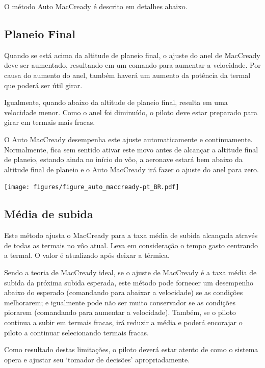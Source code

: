 O método Auto MacCready é descrito em detalhes abaixo.  

\subsection*{Planeio Final}

Quando se está acima da altitude de planeio final, o ajuste do anel de MacCready deve ser aumentado, resultando em um comando para aumentar a velocidade.  Por causa do aumento do anel, também haverá um aumento da potência da termal que poderá ser útil girar.

Igualmente, quando abaixo da altitude de planeio final, resulta em uma velocidade menor.  Como o anel foi diminuído, o piloto deve estar preparado para girar em termais mais fracas.

O Auto MacCready desempenha este ajuste automaticamente e continuamente.  Normalmente, fica sem sentido ativar este movo antes de alcançar a altitude final de planeio, estando ainda no início do vôo, a aeronave estará bem abaixo da altitude final de planeio e o Auto MacCready irá fazer o ajuste do anel para zero.  


\begin{maxipage}
\begin{center}
\texttt{[image: figures/figure\_auto\_maccready-pt\_BR.pdf]}
\end{center}
\end{maxipage}


\subsection*{Média de subida}

Este método ajusta o MacCready para a taxa média de subida alcançada através de todas as termais no vôo atual.  Leva em consideração o tempo gasto centrando a termal.  O valor é atualizado após deixar a térmica.

Sendo a teoria de MacCready ideal, se o ajuste de MacCready é a taxa média de subida da próxima subida esperada, este método pode fornecer um desempenho abaixo do esperado (comandando para abaixar a velocidade) se as condições melhorarem; e igualmente pode não ser muito conservador se as condições piorarem (comandando para aumentar a velocidade).  Também, se o piloto continua a subir em termais fracas, irá reduzir a média e poderá encorajar o piloto a continuar selecionando termais fracas.

Como resultado destas limitações, o piloto deverá estar atento de como o sistema opera e ajustar seu ‘tomador de decisões’ apropriadamente.


